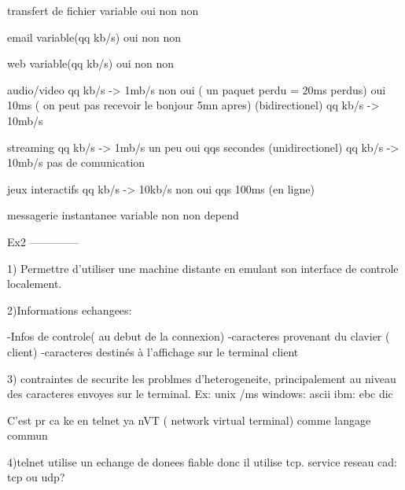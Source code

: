 transfert de fichier                variable                       oui                                            non                                                  non

email                               variable(qq kb/s)              oui                                            non                                                  non


web                                 variable(qq kb/s)              oui                                            non                                                  non


audio/video                         qq kb/s -> 1mb/s                non                                           oui ( un paquet perdu = 20ms perdus)                 oui  10ms ( on peut pas recevoir le bonjour 5mn apres)
(bidirectionel)                     qq kb/s -> 10mb/s


streaming                             qq kb/s -> 1mb/s             un peu                                         oui                                                   qqs secondes      
(unidirectionel)                      qq kb/s -> 10mb/s
pas de comunication


jeux interactifs                       qq kb/s -> 10kb/s            non                                           oui                                                   qqs 100ms
(en ligne)


messagerie instantanee                    variable                   non                                               non                                                 depend




Ex2
--------------


1)
Permettre d'utiliser une machine distante en emulant son interface de controle localement.

2)Informations echangees:

-Infos de controle( au debut de la connexion)
-caracteres provenant du clavier ( client)
-caracteres destinés à l'affichage sur le terminal client

3)
contraintes de securite
 les problmes d'heterogeneite, principalement au niveau des caracteres envoyes sur le terminal.
Ex: unix /ms windows: ascii
    ibm:              ebc dic

C'est pr ca ke en telnet ya nVT ( network virtual terminal) comme langage  commun

4)telnet utilise un echange de donees fiable donc il utilise tcp.
  service reseau cad: tcp ou udp?


